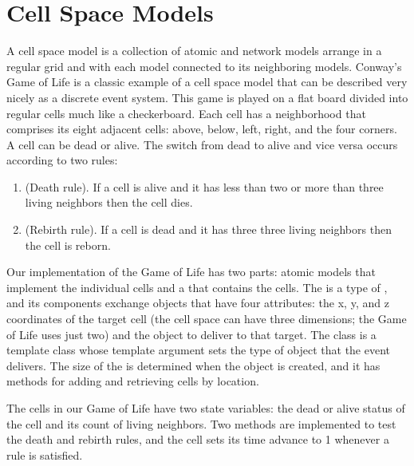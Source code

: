 \section{Cell Space Models}
A cell space model is a collection of atomic and network models arrange in a regular grid and with each model connected to its neighboring models. Conway's Game of Life is a classic example of a cell space model that can be described very nicely as a discrete event system. This game is played on a flat board divided into regular cells much like a checkerboard. Each cell has a neighborhood that comprises its eight adjacent cells: above, below, left, right, and the four corners. A cell can be dead or alive. The switch from dead to alive and vice versa occurs according to two rules:
\begin{enumerate}
\item (Death rule). If a cell is alive and it has less than two or more than three living neighbors then the cell dies.
\item (Rebirth rule). If a cell is dead and it has three three living neighbors then the cell is reborn.
\end{enumerate}

Our implementation of the Game of Life has two parts: atomic models that implement the individual cells and a  that contains the cells. The  is a type of , and its components exchange  objects that have four attributes: the x, y, and z coordinates of the target cell (the cell space can have three dimensions; the Game of Life uses just two) and the object to deliver to that target. The  class is a template class whose template argument sets the type of object that the event delivers. The size of the  is determined when the  object is created, and it has methods for adding and retrieving cells by location. 

The  cells in our Game of Life have two state variables: the dead or alive status of the cell and its count of living neighbors. Two methods are implemented to test the death and rebirth rules, and the cell sets its time advance to 1 whenever a rule is satisfied.

